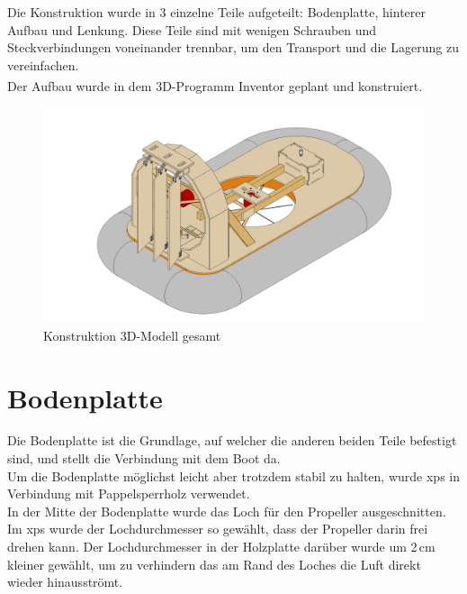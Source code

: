 Die Konstruktion wurde in 3 einzelne Teile aufgeteilt: Bodenplatte, hinterer Aufbau und Lenkung. Diese Teile sind mit wenigen Schrauben und Steckverbindungen voneinander trennbar, um den Transport und die Lagerung zu vereinfachen.\\
Der Aufbau wurde in dem 3D-Programm Inventor\textsuperscript{\cite{Inventor}} geplant und konstruiert.\\
\begin{figure}[H]
    \centering
    \includegraphics[width=\textwidth]{../Inventor/Luftkissenboot.png}
    \caption{Konstruktion 3D-Modell gesamt}
\end{figure}

\clearpage
\section{Bodenplatte}
Die Bodenplatte ist die Grundlage, auf welcher die anderen beiden Teile befestigt sind, und stellt die Verbindung mit dem Boot da.\\
Um die Bodenplatte möglichst leicht aber trotzdem stabil zu halten, wurde \ac{xps} in Verbindung mit Pappelsperrholz verwendet.\\
In der Mitte der Bodenplatte wurde das Loch für den Propeller ausgeschnitten. Im \ac{xps} wurde der Lochdurchmesser so gewählt, dass der Propeller darin frei drehen kann. Der Lochdurchmesser in der Holzplatte darüber wurde um 2\,cm kleiner gewählt, um zu verhindern das am Rand des Loches die Luft direkt wieder hinausströmt.


